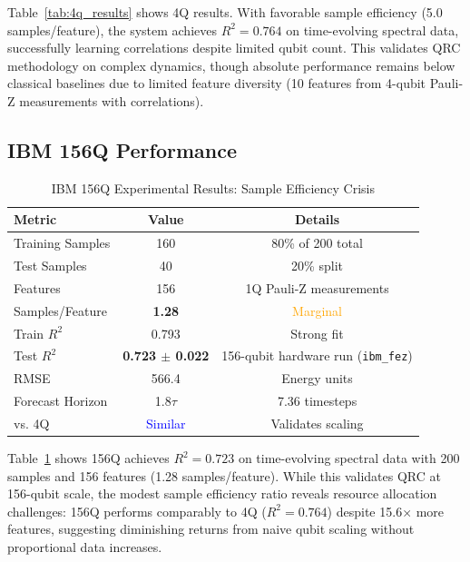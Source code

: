 \documentclass[conference]{IEEEtran}
\begin{document}
Table~\ref{tab:4q_results} shows 4Q results. With favorable sample efficiency (5.0 samples/feature), the system achieves $R^2=0.764$ on time-evolving spectral data, successfully learning correlations despite limited qubit count. This validates QRC methodology on complex dynamics, though absolute performance remains below classical baselines due to limited feature diversity (10 features from 4-qubit Pauli-Z measurements with correlations).

\subsection{IBM 156Q Performance}

\begin{table}[!htbp]
\centering
\caption{IBM 156Q Experimental Results: Sample Efficiency Crisis}
\label{tab:156q_results}
\begin{tabular}{@{}lcc@{}}
\toprule
\textbf{Metric} & \textbf{Value} & \textbf{Details} \\
\midrule
Training Samples & 160 & 80\% of 200 total \\
Test Samples & 40 & 20\% split \\
Features & 156 & 1Q Pauli-Z measurements \\
Samples/Feature & \textbf{1.28} & \textcolor{orange}{Marginal} \\
\midrule
Train $R^2$ & 0.793 & Strong fit \\
Test $R^2$ & \textbf{0.723 $\pm$ 0.022} & 156-qubit hardware run (\texttt{ibm\_fez}) \\
RMSE & 566.4 & Energy units \\
\midrule
Forecast Horizon & 1.8$\tau$ & 7.36 timesteps \\
vs. 4Q & \textcolor{blue}{Similar} & Validates scaling \\
\bottomrule
\end{tabular}
\end{table}

Table~\ref{tab:156q_results} shows 156Q achieves $R^2=0.723$ on time-evolving spectral data with 200 samples and 156 features (1.28 samples/feature). While this validates QRC at 156-qubit scale, the modest sample efficiency ratio reveals resource allocation challenges: 156Q performs comparably to 4Q ($R^2=0.764$) despite 15.6× more features, suggesting diminishing returns from naive qubit scaling without proportional data increases.
\end{document}
